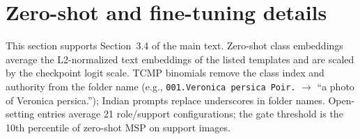 \FloatBarrier
\section{Zero-shot and fine-tuning details}\label{sec:s-alt}
This section supports Section~3.4 of the main text. Zero-shot class embeddings average the L2-normalized text embeddings of the listed templates and are scaled by the checkpoint logit scale. TCMP binomials remove the class index and authority from the folder name (e.g., \texttt{001.Veronica persica Poir.} $\rightarrow$ ``a photo of Veronica persica.''); Indian prompts replace underscores in folder names. Open-setting entries average 21 role/support configurations; the gate threshold is the 10th percentile of zero-shot MSP on support images.

\begin{table}[!htbp]\centering\small
\caption{BioCLIP 2 zero-shot classification (\%). The four-template ensemble adds ``\{name\}, a medicinal plant'' and the bare name.}\label{tab:s-zeroshot}
\ifdim\wd\tablebox>\linewidth\resizebox{\linewidth}{!}{\usebox{\tablebox}}\else\usebox{\tablebox}\fi
\end{table}

